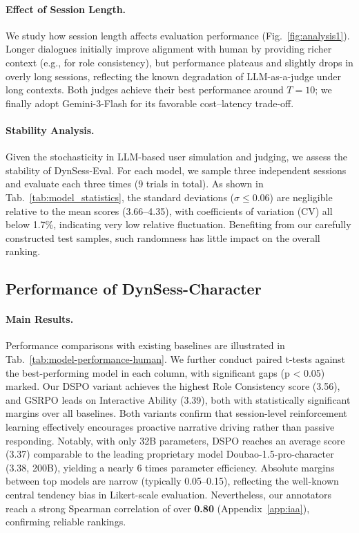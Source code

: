 \paragraph{Effect of Session Length.}
We study how session length affects evaluation performance (Fig.~\ref{fig:analysis1}). Longer dialogues initially improve alignment with human by providing richer context (e.g., for role consistency), but performance plateaus and slightly drops in overly long sessions, reflecting the known degradation of LLM-as-a-judge under long contexts. Both judges achieve their best performance around $T=10$; we finally adopt Gemini-3-Flash for its favorable cost–latency trade-off.

\paragraph{Stability Analysis.}
Given the stochasticity in LLM-based user simulation and judging, we assess the stability of DynSess-Eval. For each model, we sample three independent sessions and evaluate each three times (9 trials in total). As shown in Tab.~\ref{tab:model_statistics}, the standard deviations ($\sigma \leq 0.06$) are negligible relative to the mean scores (3.66–4.35), with coefficients of variation (CV) all below 1.7\%, indicating very low relative fluctuation. Benefiting from our carefully constructed test samples, such randomness has little impact on the overall ranking.

\subsection{Performance of DynSess-Character}
\paragraph{Main Results.}
Performance comparisons with existing baselines are illustrated in Tab.~\ref{tab:model-performance-human}. We further conduct paired t-tests against the best-performing model in each column, with significant gaps (p < 0.05) marked.
Our DSPO variant achieves the highest Role Consistency score (3.56), and GSRPO leads on Interactive Ability (3.39), both with statistically significant margins over all baselines. Both variants confirm that  session-level reinforcement learning effectively encourages proactive narrative driving rather than passive responding. Notably, with only 32B parameters, DSPO reaches an average score (3.37) comparable to the leading proprietary model Doubao-1.5-pro-character (3.38, 200B), yielding a nearly 6 times parameter efficiency. Absolute margins between top models are narrow (typically 0.05--0.15), reflecting the well-known central tendency bias in Likert-scale evaluation. Nevertheless, our annotators reach a strong Spearman correlation of over \textbf{0.80} (Appendix~\ref{app:iaa}), confirming reliable rankings.

